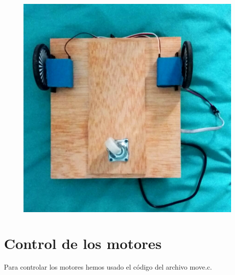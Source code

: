\documentclass[11pt, a4paper]{article}
\begin{document}
\begin{figure}[htbp]
{\begin{minipage}{0.31\linewidth}
	\end{minipage}
	\hfill
	\begin{minipage}{0.31\linewidth}
		\centering
		\includegraphics[width=\textwidth]{robbot}
	\end{minipage}}
\end{figure}

\section{Control de los motores}
Para controlar los motores hemos usado el código del archivo move.c.
\end{document}

